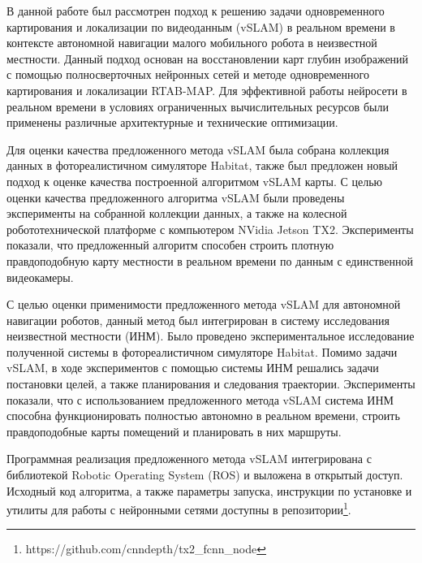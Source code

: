 \documentclass{mipt-thesis-ms}
\begin{document}
	В данной работе был рассмотрен подход к решению задачи одновременного картирования и локализации по видеоданным (vSLAM) в реальном времени в контексте автономной навигации малого мобильного робота в неизвестной местности. Данный подход основан на восстановлении карт глубин изображений с помощью полносверточных нейронных сетей и методе одновременного картирования и локализации RTAB-MAP. Для эффективной работы нейросети в реальном времени в условиях ограниченных вычислительных ресурсов были применены различные архитектурные и технические оптимизации.
	
	Для оценки качества предложенного метода vSLAM была собрана коллекция данных в фотореалистичном симуляторе Habitat, также был предложен новый подход к оценке качества построенной алгоритмом vSLAM карты. С целью оценки качества предложенного алгоритма vSLAM были проведены эксперименты на собранной коллекции данных, а также на колесной робототехнической платформе с компьютером NVidia Jetson TX2. Эксперименты показали, что предложенный алгоритм способен строить плотную правдоподобную карту местности в реальном времени по данным с единственной видеокамеры.
	
	С целью оценки применимости предложенного метода vSLAM для автономной навигации роботов, данный метод был интегрирован в систему исследования неизвестной местности (ИНМ). Было проведено экспериментальное исследование полученной системы в фотореалистичном симуляторе Habitat. Помимо задачи vSLAM, в ходе экспериментов с помощью системы ИНМ решались задачи постановки целей, а также планирования и следования траектории. Эксперименты показали, что с использованием предложенного метода vSLAM система ИНМ способна функционировать полностью автономно в реальном времени, строить правдоподобные карты помещений и планировать в них маршруты.
	
	Программная реализация предложенного метода vSLAM интегрирована с библиотекой Robotic Operating System (ROS) и выложена в открытый доступ. Исходный код алгоритма, а также параметры запуска, инструкции по установке и утилиты для работы с нейронными сетями доступны в репозитории\footnote{https://github.com/cnndepth/tx2\_fcnn\_node}.
	 
	\printbibliography
\end{document}
